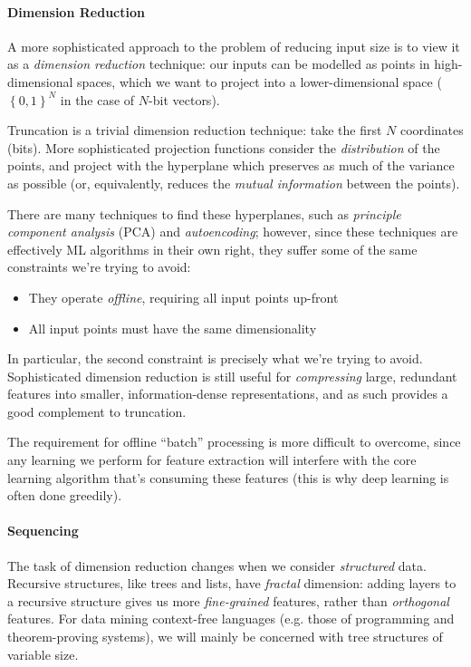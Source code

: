 \paragraph{Dimension Reduction}

A more sophisticated approach to the problem of reducing input size is to view
it as a \emph{dimension reduction} technique: our inputs can be modelled as
points in high-dimensional spaces, which we want to project into a
lower-dimensional space ($\left\{ {0, 1} \right\}^N$ in the case of $N$-bit
vectors).

Truncation is a trivial dimension reduction technique: take the first $N$
coordinates (bits). More sophisticated projection functions consider the
\emph{distribution} of the points, and project with the hyperplane which
preserves as much of the variance as possible (or, equivalently, reduces the
\emph{mutual information} between the points).

There are many techniques to find these hyperplanes, such as \emph{principle
  component analysis} (PCA) and \emph{autoencoding}; however, since these
techniques are effectively ML algorithms in their own right, they suffer some of
the same constraints we're trying to avoid:

\begin{itemize}
  \item They operate \emph{offline}, requiring all input points up-front
  \item All input points must have the same dimensionality
\end{itemize}

In particular, the second constraint is precisely what we're trying to
avoid. Sophisticated dimension reduction is still useful for \emph{compressing}
large, redundant features into smaller, information-dense representations, and
as such provides a good complement to truncation.

The requirement for offline ``batch'' processing is more difficult to overcome,
since any learning we perform for feature extraction will interfere with the
core learning algorithm that's consuming these features (this is why deep
learning is often done greedily).

\paragraph{Sequencing}

The task of dimension reduction changes when we consider \emph{structured}
data. Recursive structures, like trees and lists, have \emph{fractal} dimension:
adding layers to a recursive structure gives us more \emph{fine-grained}
features, rather than \emph{orthogonal} features. For data mining context-free
languages (e.g. those of programming and theorem-proving systems), we will
mainly be concerned with tree structures of variable size.

